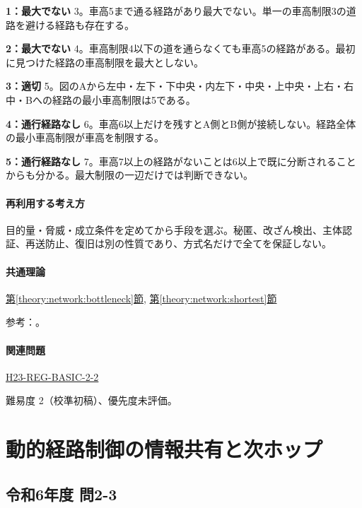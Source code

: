 \noindent\textbf{1：最大でない} 3。車高5まで通る経路があり最大でない。単一の車高制限3の道路を避ける経路も存在する。\par

\noindent\textbf{2：最大でない} 4。車高制限4以下の道を通らなくても車高5の経路がある。最初に見つけた経路の車高制限を最大としない。\par

\noindent\textbf{3：適切} 5。図のAから左中・左下・下中央・内左下・中央・上中央・上右・右中・Bへの経路の最小車高制限は5である。\par

\noindent\textbf{4：通行経路なし} 6。車高6以上だけを残すとA側とB側が接続しない。経路全体の最小車高制限が車高を制限する。\par

\noindent\textbf{5：通行経路なし} 7。車高7以上の経路がないことは6以上で既に分断されることからも分かる。最大制限の一辺だけでは判断できない。\par

\paragraph{再利用する考え方} 目的量・脅威・成立条件を定めてから手段を選ぶ。秘匿、改ざん検出、主体認証、再送防止、復旧は別の性質であり、方式名だけで全てを保証しない。

\paragraph{共通理論} \hyperref[theory:network:bottleneck]{第\ref*{theory:network:bottleneck}節}, \hyperref[theory:network:shortest]{第\ref*{theory:network:shortest}節}

\par 参考：\cite{net_dijkstra}。

\paragraph{関連問題} \hyperref[q:h23-reg-basic-2-2]{H23-REG-BASIC-2-2}

\par 難易度 2（校準初稿）、優先度未評価。

\section{動的経路制御の情報共有と次ホップ}

\subsection{令和6年度 問2-3}
\label{q:r06-reg-basic-2-3}

